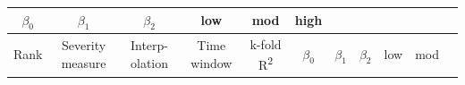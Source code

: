 \documentclass[twoside,12pt,final]{ucthesis-CA2012}
\begin{document}
\begin{ucmainmatter}
\begin{longtable}[]{@{}ccccccccccc@{}}
\begin{minipage}[b]{0.07\columnwidth}
\(\beta_0\)\strut
\end{minipage} & \begin{minipage}[b]{0.07\columnwidth}\centering\strut
\(\beta_1\)\strut
\end{minipage} & \begin{minipage}[b]{0.07\columnwidth}\centering\strut
\(\beta_2\)\strut
\end{minipage} & \begin{minipage}[b]{0.05\columnwidth}\centering\strut
low\strut
\end{minipage} & \begin{minipage}[b]{0.05\columnwidth}\centering\strut
mod\strut
\end{minipage} & \begin{minipage}[b]{0.05\columnwidth}\centering\strut
high\strut
\end{minipage}\tabularnewline
\midrule
\endfirsthead
\toprule
\begin{minipage}[b]{0.04\columnwidth}\centering\strut
Rank\strut
\end{minipage} & \begin{minipage}[b]{0.11\columnwidth}\centering\strut
Severity measure\strut
\end{minipage} & \begin{minipage}[b]{0.06\columnwidth}\centering\strut
Interp- olation\strut
\end{minipage} & \begin{minipage}[b]{0.08\columnwidth}\centering\strut
Time window\strut
\end{minipage} & \begin{minipage}[b]{0.08\columnwidth}\centering\strut
k-fold R\textsuperscript{2}\strut
\end{minipage} & \begin{minipage}[b]{0.07\columnwidth}\centering\strut
\(\beta_0\)\strut
\end{minipage} & \begin{minipage}[b]{0.07\columnwidth}\centering\strut
\(\beta_1\)\strut
\end{minipage} & \begin{minipage}[b]{0.07\columnwidth}\centering\strut
\(\beta_2\)\strut
\end{minipage} & \begin{minipage}[b]{0.05\columnwidth}\centering\strut
low\strut
\end{minipage} & \begin{minipage}[b]{0.05\columnwidth}\centering\strut
mod\strut
\end{minipage} & \begin{minipage}[b]{0.05\columnwidth}\centering\strut

\end{minipage}
\end{longtable}
\end{ucmainmatter}
\end{document}
